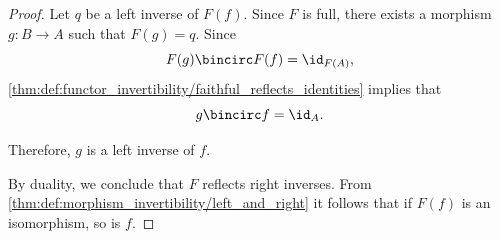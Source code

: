 \begin{proof}
  Let \( q \) be a left inverse of \( F(f) \). Since \( F \) is full, there exists a morphism \( g: B \to A \) such that \( F(g) = q \). Since
  \begin{equation*}
    F(g) \bincirc F(f) = \id_{F(A)},
  \end{equation*}
  \cref{thm:def:functor_invertibility/faithful_reflects_identities} implies that
  \begin{equation*}
    g \bincirc f = \id_A.
  \end{equation*}

  Therefore, \( g \) is a left inverse of \( f \).

  By duality, we conclude that \( F \) reflects right inverses. From \cref{thm:def:morphism_invertibility/left_and_right} it follows that if \( F(f) \) is an isomorphism, so is \( f \).
\end{proof}

